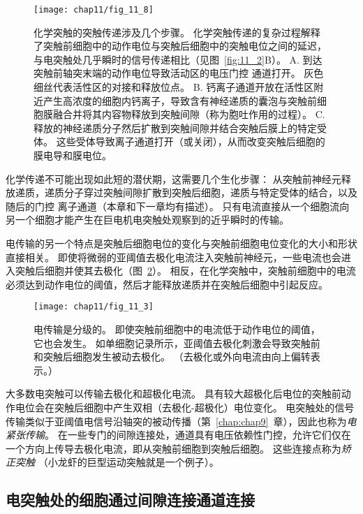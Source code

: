 \begin{figure}[htbp]
	\centering
	\texttt{[image: chap11/fig\_11\_8]}
	\caption{化学突触的突触传递涉及几个步骤。
		化学突触传递的复杂过程解释了突触前细胞中的动作电位与突触后细胞中的突触电位之间的延迟，与电突触处几乎瞬时的信号传递相比（见图~\ref{fig:11_2}B）。
		A. 到达突触前轴突末端的动作电位导致活动区的电压门控  通道打开。
		灰色细丝代表活性区的对接和释放位点。
		B. 钙离子通道开放在活性区附近产生高浓度的细胞内钙离子，导致含有神经递质的囊泡与突触前细胞膜融合并将其内容物释放到突触间隙（称为胞吐作用的过程）。
		C. 释放的神经递质分子然后扩散到突触间隙并结合突触后膜上的特定受体。
		这些受体导致离子通道打开（或关闭），从而改变突触后细胞的膜电导和膜电位。}
	\label{fig:11_8}
\end{figure}


化学传递不可能出现如此短的潜伏期，这需要几个生化步骤：
从突触前神经元释放递质，递质分子穿过突触间隙扩散到突触后细胞，递质与特定受体的结合，以及随后的门控 离子通道（本章和下一章均有描述）。
只有电流直接从一个细胞流向另一个细胞才能产生在巨电机电突触处观察到的近乎瞬时的传输。


电传输的另一个特点是突触后细胞电位的变化与突触前细胞电位变化的大小和形状直接相关。
即使将微弱的亚阈值去极化电流注入突触前神经元，一些电流也会进入突触后细胞并使其去极化（图~\ref{fig:11_3}）。
相反，在化学突触中，突触前细胞中的电流必须达到动作电位的阈值，然后才能释放递质并在突触后细胞中引起反应。


\begin{figure}[htbp]
	\centering
	\texttt{[image: chap11/fig\_11\_3]}
	\caption{电传输是分级的。
		即使突触前细胞中的电流低于动作电位的阈值，它也会发生。
		如单细胞记录所示，亚阈值去极化刺激会导致突触前和突触后细胞发生被动去极化。
		（去极化或外向电流由向上偏转表示。）}
	\label{fig:11_3}
\end{figure}


大多数电突触可以传输去极化和超极化电流。
具有较大超极化后电位的突触前动作电位会在突触后细胞中产生双相（去极化-超极化）电位变化。
电突触处的信号传输类似于亚阈值电信号沿轴突的被动传播（第~\ref{chap:chap9}~章），因此也称为\textit{电紧张传输}。
在一些专门的间隙连接处，通道具有电压依赖性门控，允许它们仅在一个方向上传导去极化电流，即从突触前细胞到突触后细胞。
这些连接点称为\textit{矫正突触}
（小龙虾的巨型运动突触就是一个例子）。



\subsection{电突触处的细胞通过间隙连接通道连接}

